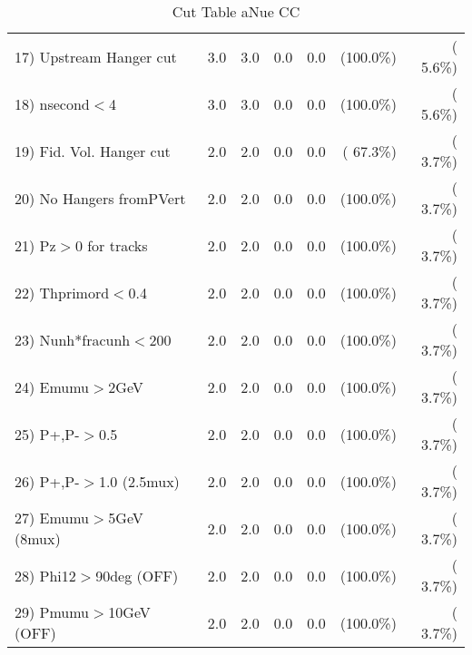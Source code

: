 \begin{table}[h!]
\begin{tabular}{||l||r|r|r|r|r|r||}
 17) Upstream Hanger cut  &          3.0 &          3.0 &          0.0 &          0.0 & (100.0\%) & (  5.6\%) \\
 18) nsecond$<$4          &          3.0 &          3.0 &          0.0 &          0.0 & (100.0\%) & (  5.6\%) \\
 19) Fid. Vol. Hanger cut &          2.0 &          2.0 &          0.0 &          0.0 & ( 67.3\%) & (  3.7\%) \\
 20) No Hangers fromPVert &          2.0 &          2.0 &          0.0 &          0.0 & (100.0\%) & (  3.7\%) \\
 21) Pz$>$0 for tracks    &          2.0 &          2.0 &          0.0 &          0.0 & (100.0\%) & (  3.7\%) \\
 22) Thprimord$<$0.4      &          2.0 &          2.0 &          0.0 &          0.0 & (100.0\%) & (  3.7\%) \\
 23) Nunh*fracunh$<$200   &          2.0 &          2.0 &          0.0 &          0.0 & (100.0\%) & (  3.7\%) \\
 24) Emumu$>$2GeV         &          2.0 &          2.0 &          0.0 &          0.0 & (100.0\%) & (  3.7\%) \\
 25) P+,P-$>$0.5          &          2.0 &          2.0 &          0.0 &          0.0 & (100.0\%) & (  3.7\%) \\
 26) P+,P-$>$1.0 (2.5mux) &          2.0 &          2.0 &          0.0 &          0.0 & (100.0\%) & (  3.7\%) \\
 27) Emumu$>$5GeV  (8mux) &          2.0 &          2.0 &          0.0 &          0.0 & (100.0\%) & (  3.7\%) \\
 28) Phi12$>$90deg  (OFF) &          2.0 &          2.0 &          0.0 &          0.0 & (100.0\%) & (  3.7\%) \\
 29) Pmumu$>$10GeV  (OFF) &          2.0 &          2.0 &          0.0 &          0.0 & (100.0\%) & (  3.7\%) \\
 \hline
 \hline
 \end{tabular}
 \caption{Cut Table  aNue CC  }
 \label{tab-cutcohjpsi-mumu_anuecc}
 \end{table}
